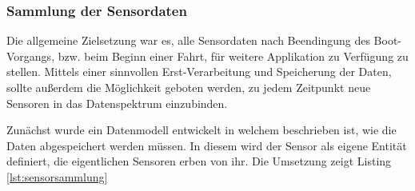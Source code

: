 \subsubsection{Sammlung der Sensordaten}
Die allgemeine Zielsetzung war es, alle Sensordaten nach Beendingung des Boot-Vorgangs, bzw. beim Beginn einer Fahrt, für weitere Applikation zu Verfügung zu stellen. Mittels einer sinnvollen Erst-Verarbeitung und Speicherung der Daten, sollte außerdem die Möglichkeit geboten werden, zu jedem Zeitpunkt neue Sensoren in das Datenspektrum einzubinden.

Zunächst wurde ein Datenmodell entwickelt in welchem beschrieben ist, wie die Daten abgespeichert werden müssen. In diesem wird der Sensor als eigene Entität definiert, die eigentlichen Sensoren erben von ihr. Die Umsetzung zeigt Listing \ref{lst:sensorsammlung}

